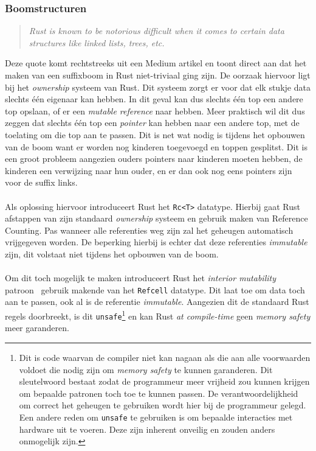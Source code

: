 \subsubsection{Boomstructuren}
\begin{quote}
    \textit{Rust is known to be notorious difficult when it comes to certain data structures like linked lists, trees, etc. \cite{rust_difficulty_quote}}
\end{quote}
Deze quote komt rechtstreeks uit een Medium artikel en toont direct aan dat het maken van een suffixboom in Rust niet-triviaal ging zijn.
De oorzaak hiervoor ligt bij het \textit{ownership} systeem van Rust.
Dit systeem zorgt er voor dat elk stukje data slechts één eigenaar kan hebben.
In dit geval kan dus slechts één top een andere top opslaan, of er een \textit{mutable reference} naar hebben.
Meer praktisch wil dit dus zeggen dat slechts één top een \textit{pointer} kan hebben naar een andere top, met de toelating om die top aan te passen.
Dit is net wat nodig is tijdens het opbouwen van de boom want er worden nog kinderen toegevoegd en toppen gesplitst.
Dit is een groot probleem aangezien ouders pointers naar kinderen moeten hebben, de kinderen een verwijzing naar hun ouder, en er dan ook nog eens pointers zijn voor de suffix links.
\\ \\
Als oplossing hiervoor introduceert Rust het \texttt{Rc<T>} datatype.
Hierbij gaat Rust afstappen van zijn standaard \textit{ownership} systeem en gebruik maken van Reference Counting.
Pas wanneer alle referenties weg zijn zal het geheugen automatisch vrijgegeven worden.
De beperking hierbij is echter dat deze referenties \textit{immutable} zijn, dit volstaat niet tijdens het opbouwen van de boom.
\\ \\
Om dit toch mogelijk te maken introduceert Rust het \textit{interior mutability} patroon~\cite{interior_mutability} gebruik makende van het \texttt{Refcell} datatype.
Dit laat toe om data toch aan te passen, ook al is de referentie \textit{immutable}.
Aangezien dit de standaard Rust regels doorbreekt, is dit \texttt{unsafe}\footnote{Dit is code waarvan de compiler niet kan nagaan als die aan alle voorwaarden voldoet die nodig zijn om \textit{memory safety} te kunnen garanderen. Dit sleutelwoord bestaat zodat de programmeur meer vrijheid zou kunnen krijgen om bepaalde patronen toch toe te kunnen passen. De verantwoordelijkheid om correct het geheugen te gebruiken wordt hier bij de programmeur gelegd. Een andere reden om \texttt{unsafe} te gebruiken is om bepaalde interacties met hardware uit te voeren. Deze zijn inherent onveilig en zouden anders onmogelijk zijn.} en kan Rust \textit{at compile-time} geen \textit{memory safety} meer garanderen.
